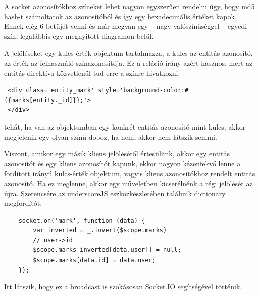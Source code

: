 A socket azonosítókhoz színeket lehet nagyon egyszerűen rendelni úgy, hogy md5 hash-t számoltatok az azonosítóból és így egy hexadecimális értéket kapok. Ennek elég 6 betűjét venni és már megvan egy -- nagy valószínűséggel -- egyedi szín, legalábbis egy megnyitott diagramon belül.


A jelöléseket egy kulcs-érték objektum tartalmazza, a kulcs az entitás azonosító, az érték az felhasználó színazonosítója. Ez a reláció irány azért hasznos, mert az entitás direktíva közvetlenül tud erre a színre hivatkozni:

\begin{lstlisting}
 <div class='entity_mark' style='background-color:#{{marks[entity._id]}};'>
 </div>
\end{lstlisting} 

tehát, ha van az objektumban egy konkrét entitás azonosító mint kulcs, akkor megjelenik egy olyan színű doboz, ha nem, akkor nem látszik semmi. 

Viszont, amikor egy másik kliens jelöléséről értesülünk, akkor egy entitás azonosítót és egy kliens azonosítót kapunk, ekkor nagyon kézenfekvő lenne a fordított irányú kulcs-érték objektum, vagyis kliens azonosítókhoz rendelt entitás azonosító. Ha ez meglenne, akkor egy műveletben kicserélnénk a régi jelölését az újra. Szerencsére az underscoreJS eszközkészletében találunk dictionary megfordítót:

\begin{lstlisting}
    socket.on('mark', function (data) {
        var inverted = _.invert($scope.marks)
        // user->id
        $scope.marks[inverted[data.user]] = null;
        $scope.marks[data.id] = data.user;
    });
\end{lstlisting}

Itt látszik, hogy ez a broadcast is szokásosan Socket.IO segítségével történik.